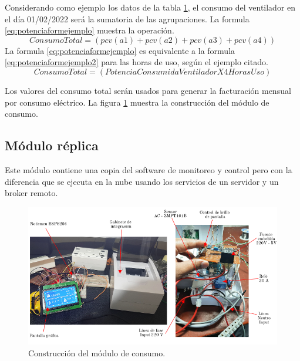 \begin{enumerate}
\begin{table}[h]
\begin{tabular}{l c c c}
		\bottomrule
		\hline
	\end{tabular}
	\label{tab:tablaconsumos}
\end{table}

Considerando como ejemplo los datos de la tabla \ref{tab:tablaconsumos}, el consumo del ventilador en el día 01/02/2022 será la sumatoria de las agrupaciones. La formula \ref{eq:potenciaformejemplo} muestra la operación.
\begin{equation}
	\label{eq:potenciaformejemplo}
	Consumo Total = \left( pcv(a1) + pcv(a2)+ pcv(a3)+ pcv(a4) \right)
\end{equation}
La formula \ref{eq:potenciaformejemplo} es equivalente a la formula \ref{eq:potenciaformejemplo2} para las horas de uso, según el ejemplo citado.
\begin{equation}
	\label{eq:potenciaformejemplo2}
	Consumo Total = \left(Potencia Consumida Ventilador X 4 Horas Uso \right)
\end{equation}

Los valores del consumo total serán usados para generar la facturación mensual por consumo eléctrico. La figura \ref{fig:modconsumo} muestra la construcción del módulo de consumo.


\end{enumerate}
\subsection{Módulo réplica}
Este módulo contiene una copia del software de monitoreo y control pero con la diferencia que se ejecuta en la nube usando los servicios de un servidor y un broker remoto.

\begin{landscape} %
\begin{figure}[htpb]
\centering 
\includegraphics[width=1.5\textwidth]{./Figures/moduloconsumo.png}
\caption{Construcción del módulo de consumo.}
\label{fig:modconsumo}
\end{figure}
\end{landscape} %

